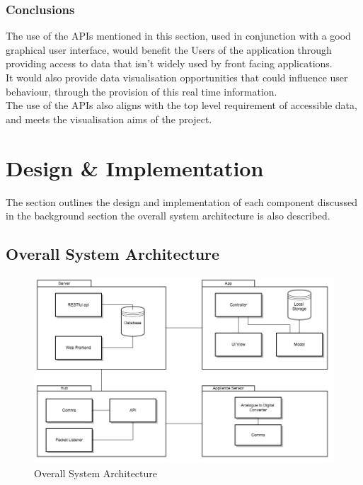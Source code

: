 \documentclass[draft,preprint,12pt,3p]{elsarticle}
\begin{document}
\subsubsection{Conclusions}
The use of the APIs mentioned in this section, used in conjunction with a good graphical user interface, would benefit the Users of the application through providing access to data that isn't widely used by front facing applications.\\
It would also provide data visualisation opportunities that could influence user behaviour, through the provision of this real time information.\\
The use of the APIs also aligns with the top level requirement of accessible data, and meets the visualisation aims of the project.




\clearpage

\section{Design \& Implementation}
The section outlines the design and implementation of each component discussed in the background section the overall system architecture is also described.

\subsection{Overall System Architecture}
\begin{figure}[H]
    \includegraphics[width=\columnwidth]{diagrams/Architecture}
    \caption {Overall System Architecture}
    \label{fig:systemarchoverall}
\end{figure}
\end{document}
